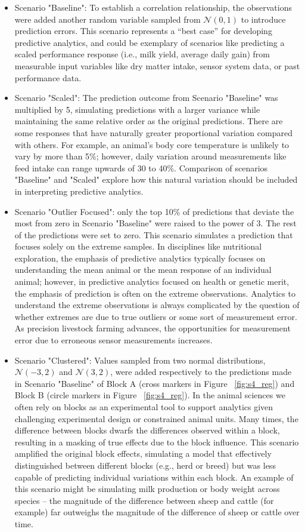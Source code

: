 \begin{itemize}
    \item Scenario "Baseline": To establish a correlation relationship, the observations were added another random variable sampled from $\mathcal{N}(0, 1)$ to introduce prediction errors. This scenario represents a “best case” for developing predictive analytics, and could be exemplary of scenarios like predicting a scaled performance response (i.e., milk yield, average daily gain) from measurable input variables like dry matter intake, sensor system data, or past performance data.
	\item Scenario "Scaled": The prediction outcome from Scenario "Baseline" was multiplied by 5, simulating predictions with a larger variance while maintaining the same relative order as the original predictions. There are some responses that have naturally greater proportional variation compared with others. For example, an animal’s body core temperature is unlikely to vary by more than 5\%; however, daily variation around measurements like feed intake can range upwards of 30 to 40\%. Comparison of scenarios "Baseline" and "Scaled" explore how this natural variation should be included in interpreting predictive analytics.
	\item Scenario "Outlier Focused": only the top 10\% of predictions that deviate the most from zero in Scenario "Baseline" were raised to the power of 3. The rest of the predictions were set to zero. This scenario simulates a prediction that focuses solely on the extreme samples. In disciplines like nutritional exploration, the emphasis of predictive analytics typically focuses on understanding the mean animal or the mean response of an individual animal; however, in predictive analytics focused on health or genetic merit, the emphasis of prediction is often on the extreme observations. Analytics to understand the extreme observations is always complicated by the question of whether extremes are due to true outliers or some sort of measurement error. As precision livestock farming advances, the opportunities for measurement error due to erroneous sensor measurements increases.
	\item Scenario "Clustered": Values sampled from two normal distributions, $\mathcal{N}(-3, 2)$ and $\mathcal{N}(3, 2)$, were added respectively to the predictions made in Scenario "Baseline" of Block A (cross markers in Figure ~\ref{fig:s4_reg}) and Block B (circle markers in Figure ~\ref{fig:s4_reg}). In the animal sciences we often rely on blocks as an experimental tool to support analytics given challenging experimental design or constrained animal units. Many times, the difference between blocks dwarfs the differences observed within a block, resulting in a masking of true effects due to the block influence. This scenario amplified the original block effects, simulating a model that effectively distinguished between different blocks (e.g., herd or breed) but was less capable of predicting individual variations within each block. An example of this scenario might be simulating milk production or body weight across species – the magnitude of the difference between sheep and cattle (for example) far outweighs the magnitude of the difference of sheep or cattle over time.
\end{itemize}
